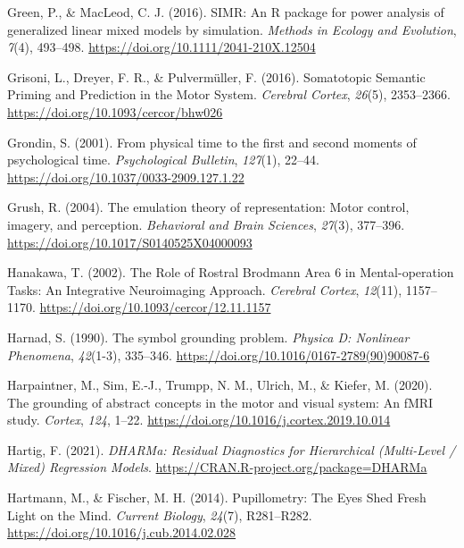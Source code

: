 \documentclass[
  a4paper,12pt,twoside,onecolumn,openright,final,oldfontcommands]{memoir}
\newlength{\cslhangindent}
\newlength{\cslentryspacingunit} %
\newenvironment{CSLReferences}[2] %
 {%
  \setlength{\parindent}{0pt}
  \ifodd #1
  \let\oldpar\par
  \def\par{\hangindent=\cslhangindent\oldpar}
  \fi
  \setlength{\parskip}{#2\cslentryspacingunit}
 }%
 {}
\begin{document}
\begin{CSLReferences}{1}{0}
\leavevmode{}%
Green, P., \& MacLeod, C. J. (2016). {SIMR}: An {R} package for power analysis of generalized linear mixed models by simulation. \emph{Methods in Ecology and Evolution}, \emph{7}(4), 493--498. \url{https://doi.org/10.1111/2041-210X.12504}

\leavevmode{}%
Grisoni, L., Dreyer, F. R., \& Pulvermüller, F. (2016). Somatotopic {Semantic} {Priming} and {Prediction} in the {Motor} {System}. \emph{Cerebral Cortex}, \emph{26}(5), 2353--2366. \url{https://doi.org/10.1093/cercor/bhw026}

\leavevmode{}%
Grondin, S. (2001). From physical time to the first and second moments of psychological time. \emph{Psychological Bulletin}, \emph{127}(1), 22--44. \url{https://doi.org/10.1037/0033-2909.127.1.22}

\leavevmode{}%
Grush, R. (2004). The emulation theory of representation: {Motor} control, imagery, and perception. \emph{Behavioral and Brain Sciences}, \emph{27}(3), 377--396. \url{https://doi.org/10.1017/S0140525X04000093}

\leavevmode{}%
Hanakawa, T. (2002). The {Role} of {Rostral} {Brodmann} {Area} 6 in {Mental}-operation {Tasks}: An {Integrative} {Neuroimaging} {Approach}. \emph{Cerebral Cortex}, \emph{12}(11), 1157--1170. \url{https://doi.org/10.1093/cercor/12.11.1157}

\leavevmode{}%
Harnad, S. (1990). The symbol grounding problem. \emph{Physica D: Nonlinear Phenomena}, \emph{42}(1-3), 335--346. \url{https://doi.org/10.1016/0167-2789(90)90087-6}

\leavevmode{}%
Harpaintner, M., Sim, E.-J., Trumpp, N. M., Ulrich, M., \& Kiefer, M. (2020). The grounding of abstract concepts in the motor and visual system: {An} {fMRI} study. \emph{Cortex}, \emph{124}, 1--22. \url{https://doi.org/10.1016/j.cortex.2019.10.014}

\leavevmode{}%
Hartig, F. (2021). \emph{{DHARMa}: {Residual} {Diagnostics} for {Hierarchical} ({Multi}-{Level} / {Mixed}) {Regression} {Models}}. \url{https://CRAN.R-project.org/package=DHARMa}

\leavevmode{}%
Hartmann, M., \& Fischer, M. H. (2014). Pupillometry: {The} {Eyes} {Shed} {Fresh} {Light} on the {Mind}. \emph{Current Biology}, \emph{24}(7), R281--R282. \url{https://doi.org/10.1016/j.cub.2014.02.028}


\end{CSLReferences}
\end{document}
